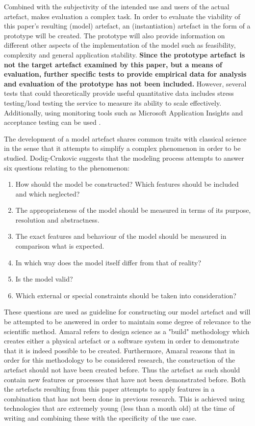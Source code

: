 Combined with the subjectivity of the intended use and users of the actual artefact, makes evaluation a complex task. In order to evaluate the viability of this paper's resulting (model) artefact, an (instantiation) artefact in the form of a prototype will be created. The prototype will also provide information on different other aspects of the implementation of the model such as feasibility, complexity and general application stability. \textbf{Since the prototype artefact is not the target artefact examined by this paper, but a means of evaluation, further specific tests to provide empirical data for analysis and evaluation of the prototype has not been included.} However, several tests that could theoretically provide useful quantitative data includes stress testing/load testing the service to measure its ability to scale effectively. Additionally, using monitoring tools such as Microsoft Application Insights and acceptance testing can be used \cite{AppINsight}.

 
The development of a model artefact shares common traits with classical science in the sense that it attempts to simplify a complex phenomenon in order to be studied. Dodig-Crnkovic \cite{Dodig-crnkovic} suggests that the modeling process attempts to answer six questions relating to the phenomenon:

\begin{enumerate}
\item How should the model be constructed? Which features should be included and which neglected?
\item The appropriateness of the model should be measured in terms of its purpose, resolution and abstractness.
\item The exact features and behaviour of the model should be measured in comparison what is expected.
\item In which way does the model itself differ from that of reality?
\item Is the model valid?
\item Which external or special constraints should be taken into consideration?
\end{enumerate}

These questions are used as guideline for constructing our model artefact and will be attempted to be answered in order to maintain some degree of relevance to the scientific method. Amaral \cite{Amaral2011} refers to design science as a "build" methodology which creates either a physical artefact or a software system in order to demonstrate that it is indeed possible to be created. Furthermore, Amaral reasons that in order for this methodology to be considered research, the construction of the artefact should not have been created before. Thus the artefact as such should contain new features or processes that have not been demonstrated before. Both the artefacts resulting from this paper attempts to apply features in a combination that has not been done in previous research. This is achieved using technologies that are extremely young (less than a month old) at the time of writing and combining these with the specificity of the use case.


